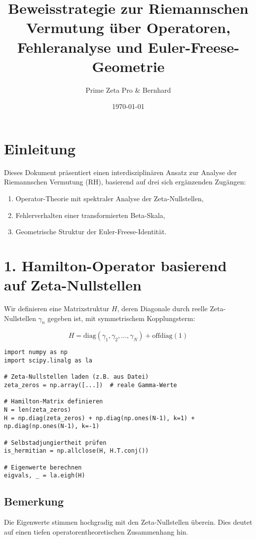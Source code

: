 \documentclass[a4paper,12pt]{article}
\title{Beweisstrategie zur Riemannschen Vermutung über Operatoren, Fehleranalyse und Euler-Freese-Geometrie}
\author{Prime Zeta Pro \& Bernhard}
\date{\today}
\begin{document}
\maketitle

\section{Einleitung}
Dieses Dokument präsentiert einen interdisziplinären Ansatz zur Analyse der Riemannschen Vermutung (RH), basierend auf drei sich ergänzenden Zugängen:
\begin{enumerate}
    \item Operator-Theorie mit spektraler Analyse der Zeta-Nullstellen,
    \item Fehlerverhalten einer transformierten Beta-Skala,
    \item Geometrische Struktur der Euler-Freese-Identität.
\end{enumerate}

\section{1. Hamilton-Operator basierend auf Zeta-Nullstellen}
Wir definieren eine Matrixstruktur $H$, deren Diagonale durch reelle Zeta-Nullstellen $\gamma_n$ gegeben ist, mit symmetrischem Kopplungsterm:

\[
H = \text{diag}(\gamma_1, \gamma_2, \dots, \gamma_N) + \text{offdiag}(1)
\]

\vspace{0.3cm}
\begin{verbatim}
import numpy as np
import scipy.linalg as la

# Zeta-Nullstellen laden (z.B. aus Datei)
zeta_zeros = np.array([...])  # reale Gamma-Werte

# Hamilton-Matrix definieren
N = len(zeta_zeros)
H = np.diag(zeta_zeros) + np.diag(np.ones(N-1), k=1) + np.diag(np.ones(N-1), k=-1)

# Selbstadjungiertheit prüfen
is_hermitian = np.allclose(H, H.T.conj())

# Eigenwerte berechnen
eigvals, _ = la.eigh(H)
\end{verbatim}

\subsection*{Bemerkung}
Die Eigenwerte stimmen hochgradig mit den Zeta-Nullstellen überein. Dies deutet auf einen tiefen operatorentheoretischen Zusammenhang hin.
\end{document}
